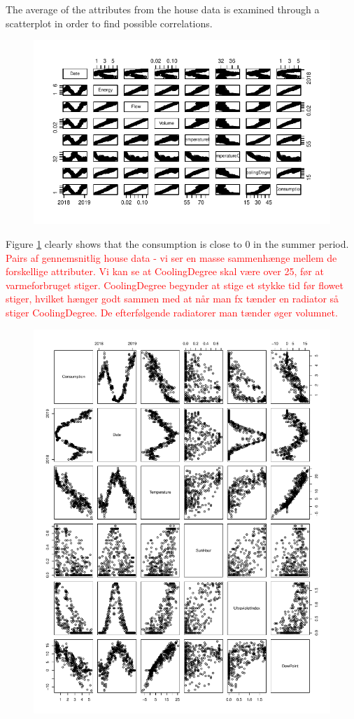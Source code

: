 The average of the attributes from the house data is examined through a scatterplot in order to find possible correlations.
\begin{figure}[H]
    \centering
    \includegraphics[width=.75\textwidth]{../../../figures/house_attri.pdf}
    \caption{}
    \label{fig: house_attri}
\end{figure}
Figure \ref{fig: house_attri} clearly shows that the consumption is close to 0 in the summer period.  
\textcolor{red}{Pairs af gennemsnitlig house data - vi ser en masse sammenhænge mellem de forskellige attributer. Vi kan se at CoolingDegree skal være over 25, før at varmeforbruget stiger.}
\textcolor{red}{CoolingDegree begynder at stige et stykke tid før flowet stiger, hvilket hænger godt sammen med at når man fx tænder en radiator så stiger CoolingDegree. De efterfølgende radiatorer man tænder øger volumnet.} \\

\begin{figure}[H]
    \centering
    \includegraphics[width=.75\textwidth]{../../../figures/weather_cons_focus.pdf}
    \caption{}
    \label{fig: weather_cons_focus}
\end{figure}

